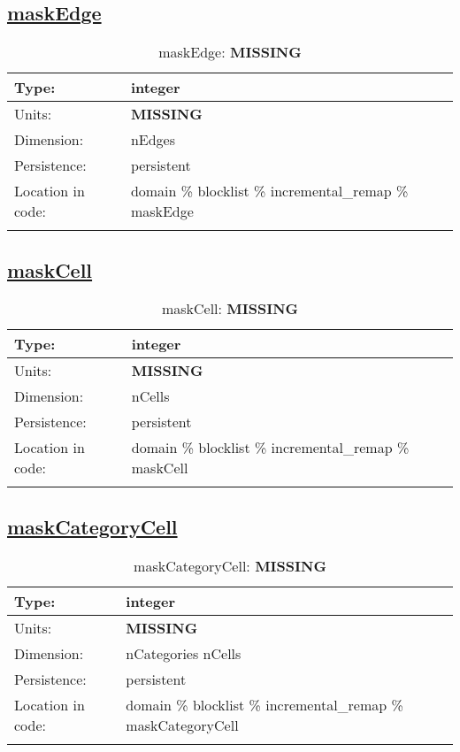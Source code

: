 \subsection[maskEdge]{\hyperref[sec:var_tab_incremental_remap]{maskEdge}}
\label{subsec:var_sec_incremental_remap_maskEdge}
\begin{center}
\begin{longtable}{| p{2.0in} | p{4.0in} |}
        \hline 
        Type: & integer \\
        \hline 
        Units: & {\bf \color{red} MISSING} \\
        \hline 
        Dimension: & nEdges \\
        \hline 
        Persistence: & persistent \\
        \hline 
         Location in code: & domain \% blocklist \% incremental\_remap \% maskEdge \\
         \hline 
    \caption{maskEdge: {\bf \color{red} MISSING}}
\end{longtable}
\end{center}
\subsection[maskCell]{\hyperref[sec:var_tab_incremental_remap]{maskCell}}
\label{subsec:var_sec_incremental_remap_maskCell}
\begin{center}
\begin{longtable}{| p{2.0in} | p{4.0in} |}
        \hline 
        Type: & integer \\
        \hline 
        Units: & {\bf \color{red} MISSING} \\
        \hline 
        Dimension: & nCells \\
        \hline 
        Persistence: & persistent \\
        \hline 
         Location in code: & domain \% blocklist \% incremental\_remap \% maskCell \\
         \hline 
    \caption{maskCell: {\bf \color{red} MISSING}}
\end{longtable}
\end{center}
\subsection[maskCategoryCell]{\hyperref[sec:var_tab_incremental_remap]{maskCategoryCell}}
\label{subsec:var_sec_incremental_remap_maskCategoryCell}
\begin{center}
\begin{longtable}{| p{2.0in} | p{4.0in} |}
        \hline 
        Type: & integer \\
        \hline 
        Units: & {\bf \color{red} MISSING} \\
        \hline 
        Dimension: & nCategories nCells \\
        \hline 
        Persistence: & persistent \\
        \hline 
         Location in code: & domain \% blocklist \% incremental\_remap \% maskCategoryCell \\
         \hline 
    \caption{maskCategoryCell: {\bf \color{red} MISSING}}
\end{longtable}
\end{center}
